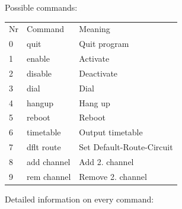   Possible commands:

  \begin{tabular}{lll}
    Nr  &Command             &Meaning\\
    0   &quit                &Quit program\\
    1   &enable              &Activate\\
    2   &disable             &Deactivate\\
    3   &dial                &Dial\\
    4   &hangup              &Hang up\\
    5   &reboot              &Reboot\\
    6   &timetable           &Output timetable\\
    7   &dflt route          &Set Default-Route-Circuit\\
    8   &add channel         &Add 2. channel\\
    9   &rem channel         &Remove 2. channel\\
  \end{tabular}

  \medskip

  \noindent Detailed information on every command:

